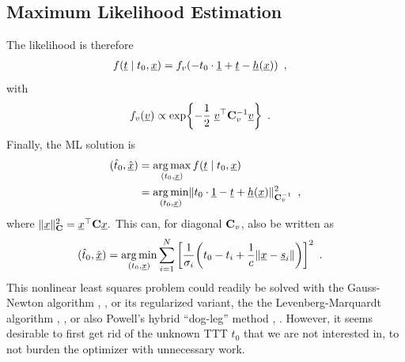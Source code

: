 \documentclass[conference]{IEEEtran}
\begin{document}
%
%
\subsection{Maximum Likelihood Estimation}
%
%
The likelihood is therefore
\begin{align}
    f({\underline{t}} \mid t_0,{\underline{x}}) &= f_v( -t_0 \cdot \underline{1} + {\underline{t}} - \underline{h}({\underline{x}})) \enspace,
\end{align}
with 
\begin{align}
    f_v({\underline{v}}) &\propto \exp\mathopen{}\left\lbrace -\frac{1}{2} \;  {\underline{v}}^\top {\mathbf C}_v^{-1} {\underline{v}} \right\rbrace\mathclose{} \enspace. 
\end{align}
%
%
Finally, the \ac{ML} solution is 
\begin{align}
    (\hat t_0, \hat {{\underline{x}}}) &= \operatorname*{arg\,max}_{(t_0,{\underline{x}})} f({\underline{t}} \mid t_0,{\underline{x}}) \\ 
    &= \operatorname*{arg\,min}_{(t_0,{\underline{x}})} \mathopen{}\left\| t_0 \cdot \underline{1} - {\underline{t}} + \underline{h}({\underline{x}}) \right\|\mathclose{}_{{\mathbf C}_v^{-1}}^2 \enspace,  \label{eq:ML-Solve}
\end{align}
where $\mathopen{}\left\| {\underline{x}} \right\|\mathclose{}^2_{{\mathbf C}} = {\underline{x}}^\top {\mathbf C} {\underline{x}}. $
This can, for diagonal ${\mathbf C}_v$, also be written as 
\begin{align}
    (\hat t_0, \hat {{\underline{x}}}) &= \operatorname*{arg\,min}_{(t_0,{\underline{x}})} \sum_{i=1}^N  {\mathopen{}\left[ \frac{1}{\sigma_i}\mathopen{}\left( t_0 - t_i + \frac{1}{c}\mathopen{}\left\| {\underline{x}}-{\underline{s}}_i \right\|\mathclose{}  \right)\mathclose{} \right]\mathclose{}}^2 \enspace. \label{eq:ML-min}
\end{align}
%
%
This nonlinear least squares problem could readily be solved with the Gauss-Newton algorithm
\cite{Gauss1809_TheoriaMotusCorporumCoelestiumInSectionibusConicisSolemAmbientiumAuctoreCaroloFridericoGauss},
\cite{Nocedal2006_NumericalOptimization},
or its regularized variant, the the Levenberg-Marquardt algorithm
\cite{Levenberg1944_AMethodForTheSolutionOfCertainNonLinearProblemsInLeastSquares},
\cite{Marquardt1963_AnAlgorithmForLeastSquaresEstimationOfNonlinearParameters}, 
or also Powell's hybrid ``dog-leg'' method
\cite{Powell1970_AHybridMethodForNonlinearEquations}, 
\cite{Byrd1988_ApproximateSolutionOfTheTrustRegionProblemByMinimizationOverTwoDimensionalSubspaces}. 
However, it seems desirable to first get rid of the unknown \ac{TTT} $t_0$ that we are not interested in, to not burden the optimizer with unnecessary work. 

%
%
\end{document}
